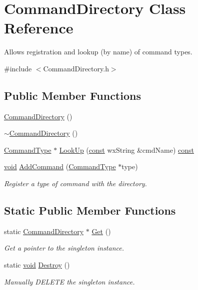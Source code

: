 \hypertarget{class_command_directory}{}\section{Command\+Directory Class Reference}
\label{class_command_directory}


Allows registration and lookup (by name) of command types.  




{\ttfamily \#include $<$Command\+Directory.\+h$>$}

\subsection*{Public Member Functions}
\begin{DoxyCompactItemize}
\item 
\hyperlink{class_command_directory_a26112149054feb4f81c60be03468a4b4}{Command\+Directory} ()
\item 
\hyperlink{class_command_directory_a37740cce2e9c1201a2650d19b10c75dc}{$\sim$\+Command\+Directory} ()
\item 
\hyperlink{class_command_type}{Command\+Type} $\ast$ \hyperlink{class_command_directory_a1e07e146ccfa51b9011084e8a467b385}{Look\+Up} (\hyperlink{getopt1_8c_a2c212835823e3c54a8ab6d95c652660e}{const} wx\+String \&cmd\+Name) \hyperlink{getopt1_8c_a2c212835823e3c54a8ab6d95c652660e}{const} 
\item 
\hyperlink{sound_8c_ae35f5844602719cf66324f4de2a658b3}{void} \hyperlink{class_command_directory_af3d3f4de666a03fa5fd76c0435fa6bab}{Add\+Command} (\hyperlink{class_command_type}{Command\+Type} $\ast$type)
\begin{DoxyCompactList}\small\item\em Register a type of command with the directory. \end{DoxyCompactList}\end{DoxyCompactItemize}
\subsection*{Static Public Member Functions}
\begin{DoxyCompactItemize}
\item 
static \hyperlink{class_command_directory}{Command\+Directory} $\ast$ \hyperlink{class_command_directory_af75ad5df0389c85cf40f6940cb3219d4}{Get} ()
\begin{DoxyCompactList}\small\item\em Get a pointer to the singleton instance. \end{DoxyCompactList}\item 
static \hyperlink{sound_8c_ae35f5844602719cf66324f4de2a658b3}{void} \hyperlink{class_command_directory_a8bfa1657f052cd3367a793754d00889f}{Destroy} ()
\begin{DoxyCompactList}\small\item\em Manually D\+E\+L\+E\+TE the singleton instance. \end{DoxyCompactList}\end{DoxyCompactItemize}


